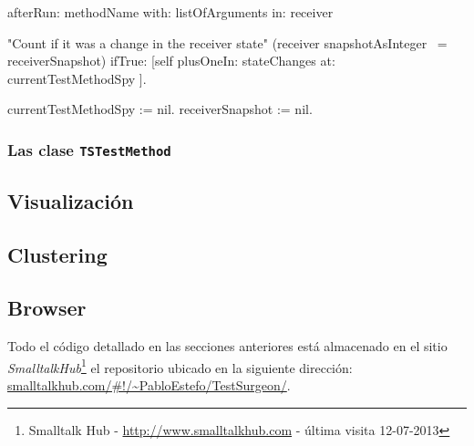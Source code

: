 \begin{codeWithLineNumbers}
afterRun: methodName with: listOfArguments in: receiver

	"Count if it was a change in the receiver state"
	(receiver snapshotAsInteger ~= receiverSnapshot) ifTrue: [self plusOneIn: stateChanges at: currentTestMethodSpy ]. 

	currentTestMethodSpy := nil.
	receiverSnapshot := nil.

\end{codeWithLineNumbers}\label{code:after-run}
\lstlistingname


\subsubsection{Las clase {\tt TSTestMethod} }

\subsection{Visualización}

\subsection{Clustering}

\subsection{Browser}


\par Todo el código detallado en las secciones anteriores está almacenado en el sitio \emph{SmalltalkHub}\footnote{Smalltalk Hub - \url{http://www.smalltalkhub.com} - última visita 12-07-2013 } el repositorio ubicado en la siguiente dirección: \url{smalltalkhub.com/#!/~PabloEstefo/TestSurgeon/}. 